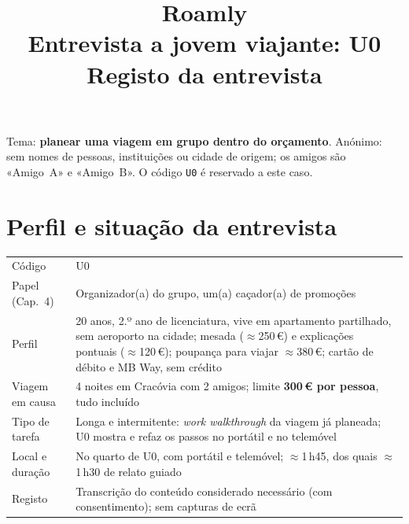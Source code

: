 \documentclass[11pt,a4paper]{article}
\title{\textbf{Roamly}\\[2pt]\large Entrevista a jovem viajante: U0\\\normalsize Registo da entrevista}
\author{}\date{}
\begin{document}
\maketitle

\begin{aviso}
Tema: \textbf{planear uma viagem em grupo dentro do orçamento}.
Anónimo: sem nomes de pessoas, instituições ou cidade de origem; os amigos são
«Amigo~A» e «Amigo~B». O código \texttt{U0} é reservado a este caso.
\end{aviso}

\section{Perfil e situação da entrevista}
\begin{tabularx}{\textwidth}{@{}p{4.3cm}L@{}}
\toprule
Código & U0 \\
Papel (Cap.~4) & Organizador(a) do grupo, um(a) caçador(a) de promoções \\
Perfil & 20 anos, 2.º ano de licenciatura, vive em apartamento partilhado, 
sem aeroporto na cidade; mesada (\(\approx\)250\,€) e explicações pontuais 
(\(\approx\)120\,€); poupança para viajar \(\approx\)380\,€; cartão de débito e 
MB Way, sem crédito \\
Viagem em causa & 4 noites em Cracóvia com 2 amigos; limite \textbf{300\,€ por pessoa},
tudo incluído \\
Tipo de tarefa & Longa e intermitente: \emph{work walkthrough} da viagem já planeada; 
U0 mostra e refaz os passos no portátil e no telemóvel \\
Local e duração & No quarto de U0, com portátil e telemóvel; \(\approx\)1\,h45, 
dos quais \(\approx\)1\,h30 de relato guiado \\
Registo & Transcrição do conteúdo considerado necessário (com consentimento); sem 
capturas de ecrã \\
\bottomrule
\end{tabularx}

\end{document}
